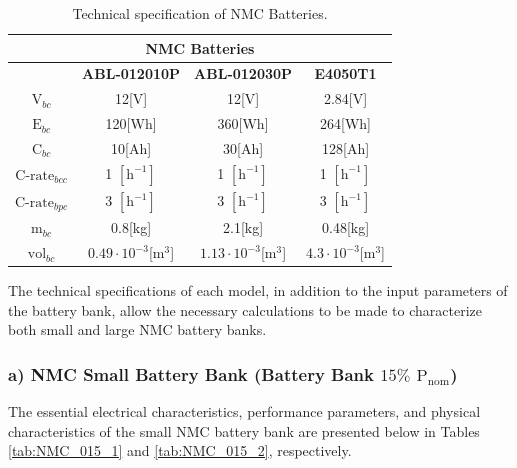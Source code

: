 \begin{table}[H]
	\centering
	\caption{Technical specification of NMC Batteries.}
	\label{tab:Technical_inputNMC}
	\begin{tabular}{|c|c|c|c|}
		\hline
		\multicolumn{4}{|c|}{\textbf{NMC Batteries}} \\
		\hline\hline
		 &  \textbf{ABL-012010P} & \textbf{ABL-012030P} & \textbf{E4050T1}\\
		 \hline
		$\text{V}_{bc}$ & 12[V]  & 12[V] & 2.84[V] \\	
		\hline
		$\text{E}_{bc}$ &  120[Wh] & 360[Wh] & 264[Wh]\\	
		\hline
		$\text{C}_{bc}$ &  10[Ah] & 30[Ah] & 128[Ah]\\	
		\hline
		$\text{C-rate}_{bcc}$ & 1 $[\text{h}^{-1}]$ & 1 $[\text{h}^{-1}]$ & 1 $[\text{h}^{-1}]$\\	
		\hline
		$\text{C-rate}_{bpc}$ & 3 $[\text{h}^{-1}]$  & 3 $[\text{h}^{-1}]$ & 3 $[\text{h}^{-1}]$\\	
		\hline
		$\text{m}_{bc}$ & 0.8[kg]& 2.1[kg] & 0.48[kg]\\	
		\hline
		$\text{vol}_{bc}$ &  $0.49\cdot{10}^{-3}$[${\text{m}}^{3}$]& $1.13\cdot{10}^{-3}$[${\text{m}}^{3}$] & $4.3\cdot{10}^{-3}$[${\text{m}}^{3}$]    \\	
		\hline
	\end{tabular}
\end{table} 

The technical specifications of each model, in addition to the input parameters of the battery bank, allow the necessary calculations to be made to characterize both small and large NMC battery banks.

\subsubsection{a) NMC Small Battery Bank (Battery Bank $15\%$ ${\text{P}}_{\text{nom}}$)}

The essential electrical characteristics, performance parameters, and physical characteristics of the small NMC battery bank are presented below in Tables \ref{tab:NMC_015_1} and \ref{tab:NMC_015_2}, respectively.

